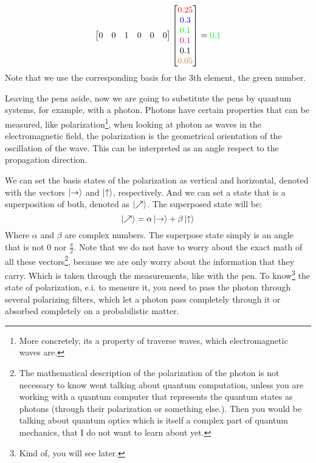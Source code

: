 $$
\begin{bmatrix}
	0 & 0 & 1 & 0 & 0 & 0\\
\end{bmatrix}
\begin{bmatrix}
	\textcolor{red}{0.25} \\
	\textcolor{blue}{0.3 }\\
	\textcolor{green}{0.1 }\\
	\textcolor{magenta}{0.1 }\\
	\textcolor{black}{0.1 }\\
	\textcolor{brown}{0.05}
\end{bmatrix} = \textcolor{green}{0.1 }
$$
Note that we use the corresponding basis for the 3th element, the green number.

Leaving the pens aside, now we are going to substitute the pens by quantum systems, for example, with a photon. Photons have certain properties that can be measured, like polarization\footnote{More concretely, its a property of traverse waves, which electromagnetic waves are.}, when looking at photon as waves in the electromagnetic field, the polarization is the geometrical orientation of the oscillation of the wave. This can be interpreted as an angle respect to the propagation direction. 

We can set the basis states of the polarization as vertical and horizontal, denoted with the vectors $\ket{\text{\textrightarrow}}$ and $\ket{\text{\textuparrow}}$, respectively. And we can set a state that is a superposition of both, denoted as $\ket{\nearrow}$. 
The superposed state will be: 
$$
\ket{\nearrow} = \alpha\ket{\text{\textrightarrow}} + \beta\ket{\text{\textuparrow}}
$$
Where $\alpha$ and $\beta$ are complex numbers.
The superpose state simply is an angle that is not $0$ nor $\frac{\pi}{2}$. Note that we do not have to worry about the exact math of all these vectors\footnote{The mathematical description of the polarization of the photon is not necessary to know went talking about quantum computation, unless you are working with a quantum computer that represents the quantum states as photons (through their polarization or something else.). Then you would be talking about quantum optics which is itself a complex part of quantum mechanics, that I do not want to learn about yet.}, because we are only worry about the information that they carry. Which is taken through the measurements, like with the pen. To know\footnote{Kind of, you will see later.} the state of polarization, e.i. to measure it, you need to pass the photon through several polarizing filters, which let a photon pass completely through it or absorbed completely on a probabilistic matter. 

